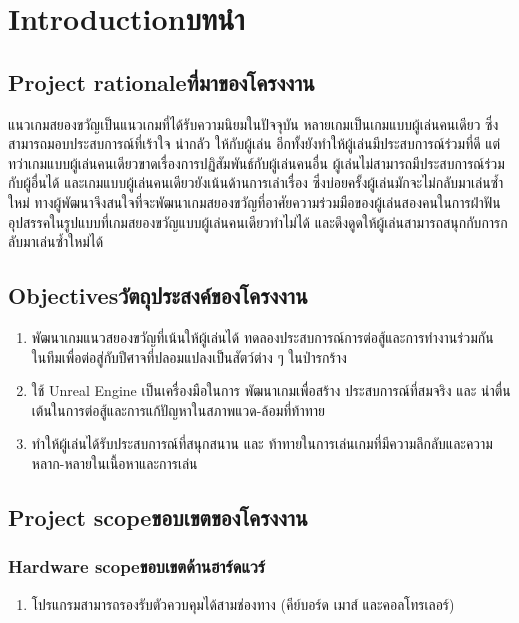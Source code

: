 \chapter{\ifenglish Introduction\else บทนำ\fi}

\section{\ifenglish Project rationale\else ที่มาของโครงงาน\fi}
แนวเกมสยองขวัญเป็นแนวเกมที่ได้รับความนิยมในปัจจุบัน หลายเกมเป็นเกมแบบผู้เล่นคนเดียว ซึ่งสามารถมอบประสบการณ์ที่เร้าใจ น่ากลัว ให้กับผู้เล่น อีกทั้งยังทำให้ผู้เล่นมีประสบการณ์ร่วมที่ดี แต่ทว่าเกมแบบผู้เล่นคนเดียวขาดเรื่องการปฏิสัมพันธ์กับผู้เล่นคนอื่น ผู้เล่นไม่สามารถมีประสบการณ์ร่วมกับผู้อื่นได้ และเกมแบบผู้เล่นคนเดียวยังเน้นด้านการเล่าเรื่อง ซึ่งบ่อยครั้งผู้เล่นมักจะไม่กลับมาเล่นซ้ำใหม่ ทางผู้พัฒนาจึงสนใจที่จะพัฒนาเกมสยองขวัญที่อาศัยความร่วมมือของผู้เล่นสองคนในการฝ่าฟันอุปสรรคในรูปแบบที่เกมสยองขวัญแบบผู้เล่นคนเดียวทำไม่ได้ และดึงดูดให้ผู้เล่นสามารถสนุกกับการกลับมาเล่นซ้ำใหม่ได้

\section{\ifenglish Objectives\else วัตถุประสงค์ของโครงงาน\fi}
\begin{enumerate}
    \item พัฒนาเกมแนวสยองขวัญที่เน้นให้ผู้เล่นได้ ทดลองประสบการณ์การต่อสู้และการทำงานร่วมกัน ในทีมเพื่อต่อสู่กับปีศาจที่ปลอมแปลงเป็นสัตว์ต่าง ๆ ในป่ารกร้าง
    \item ใช้ Unreal Engine เป็นเครื่องมือในการ พัฒนาเกมเพื่อสร้าง ประสบการณ์ที่สมจริง และ น่าตื่นเต้นในการต่อสู้และการแก้ปัญหาในสภาพแวด-ล้อมที่ท้าทาย
    \item ทำให้ผู้เล่นได้รับประสบการณ์ที่สนุกสนาน และ ท้าทายในการเล่นเกมที่มีความลึกลับและความหลาก-หลายในเนื้อหาและการเล่น
\end{enumerate}

\section{\ifenglish Project scope\else ขอบเขตของโครงงาน\fi}

\subsection{\ifenglish Hardware scope\else ขอบเขตด้านฮาร์ดแวร์\fi}
\begin{enumerate}
    \item โปรแกรมสามารถรองรับตัวควบคุมได้สามช่องทาง (คีย์บอร์ด เมาส์ และคอลโทรเลอร์)
\end{enumerate}


